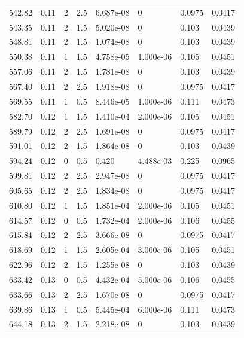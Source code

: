 \documentclass[preview]{standalone}
\begin{document}
{{{\begin{tabular}{L{1.2cm}C{1.2cm} C{0.3cm}C{0.5cm} C{1.4cm}C{1.4cm} C{1.4cm}C{1.4cm}}
  542.82  &  0.11  & 2     & 2.5 &  6.687e-08  & 0  & 0.0975 &  0.0417   \\ 
  543.35  &  0.11  & 2     & 1.5 &  5.020e-08  & 0  & 0.103 &  0.0439   \\ 
  548.81  &  0.11  & 2     & 1.5 &  1.074e-08  & 0  & 0.103 &  0.0439   \\ 
  550.38  &  0.11  & 1     & 1.5 &  4.758e-05  & 1.000e-06  & 0.105 &  0.0451   \\ 
  557.06  &  0.11  & 2     & 1.5 &  1.781e-08  & 0  & 0.103 &  0.0439   \\ 
  567.40  &  0.11  & 2     & 2.5 &  1.918e-08  & 0  & 0.0975 &  0.0417   \\ 
  569.55  &  0.11  & 1     & 0.5 &  8.446e-05  & 1.000e-06  & 0.111 &  0.0473   \\ 
  582.70  &  0.12  & 1     & 1.5 &  1.410e-04  & 2.000e-06  & 0.105 &  0.0451   \\ 
  589.79  &  0.12  & 2     & 2.5 &  1.691e-08  & 0  & 0.0975 &  0.0417   \\ 
  591.01  &  0.12  & 2     & 1.5 &  1.864e-08  & 0  & 0.103 &  0.0439   \\ 
  594.24  &  0.12  & 0     & 0.5 &  0.420  & 4.488e-03  & 0.225 &  0.0965   \\ 
  599.81  &  0.12  & 2     & 2.5 &  2.947e-08  & 0  & 0.0975 &  0.0417   \\ 
  605.65  &  0.12  & 2     & 2.5 &  1.834e-08  & 0  & 0.0975 &  0.0417   \\ 
  610.80  &  0.12  & 1     & 1.5 &  1.851e-04  & 2.000e-06  & 0.105 &  0.0451   \\ 
  614.57  &  0.12  & 0     & 0.5 &  1.732e-04  & 2.000e-06  & 0.106 &  0.0455   \\ 
  615.84  &  0.12  & 2     & 2.5 &  3.666e-08  & 0  & 0.0975 &  0.0417   \\ 
  618.69  &  0.12  & 1     & 1.5 &  2.605e-04  & 3.000e-06  & 0.105 &  0.0451   \\ 
  622.96  &  0.12  & 2     & 1.5 &  1.255e-08  & 0  & 0.103 &  0.0439   \\ 
  633.42  &  0.13  & 0     & 0.5 &  4.432e-04  & 5.000e-06  & 0.106 &  0.0455   \\ 
  633.66  &  0.13  & 2     & 2.5 &  1.670e-08  & 0  & 0.0975 &  0.0417   \\ 
  639.86  &  0.13  & 1     & 0.5 &  5.445e-04  & 6.000e-06  & 0.111 &  0.0473   \\ 
  644.18  &  0.13  & 2     & 1.5 &  2.218e-08  & 0  & 0.103 &  0.0439   \\ 

\end{tabular}}}}
\end{document}
